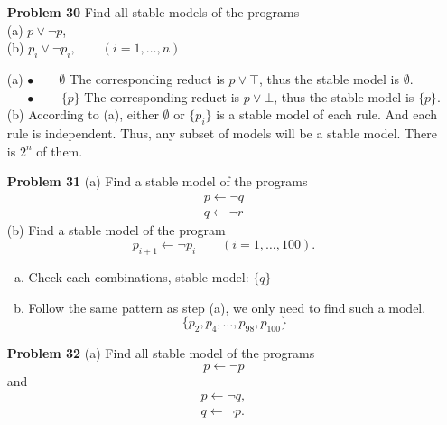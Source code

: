 \begin{enumerate}
\item[\textbf{Problem 30}] Find all stable models of the programs \\
(a) $p \vee \neg p$, \\
(b) $p_i \vee \neg p_i, \qquad (i = 1, \ldots, n)$

(a) $\bullet \qquad \emptyset$ The corresponding reduct is $p \vee \top$, thus the stable model is $\emptyset$. \\
    $~\quad\: \bullet \qquad \{p\}$ The corresponding reduct is $p \vee \bot$, thus the stable model is $\{p\}$. \\
    
(b) According to (a), either $\emptyset$ or $\{p_i\}$ is a stable model of each rule. And each rule is independent. Thus, any subset of models will be a stable model. There is $2^n$ of them.  

\item[\textbf{Problem 31}] (a) Find a stable model of the programs \\
\begin{equation}
\begin{gathered}
 p \leftarrow \neg q  \\
 q \leftarrow \neg r
\end{gathered}
\label{Prob_31}
\end{equation}
(b) Find a stable model of the program 
\begin{equation*}
 p_{i+1} \leftarrow \neg p_i \qquad (i = 1, \ldots, 100). 
\end{equation*}

\begin{enumerate}[(a)]
\item Check each combinations, stable model:  $\{q\}$
\item Follow the same pattern as step (a), we only need to find such a model. 
\begin{equation*}
 \{p_2, p_4, \ldots, p_{98}, p_{100}\}
\end{equation*}
\end{enumerate}

\item[\textbf{Problem 32}] (a) Find all stable model of the programs 
\begin{equation*}
 p \leftarrow \neg p
\end{equation*}
and 
\begin{gather*}
p \leftarrow \neg q, \\
q \leftarrow \neg p. 
\end{gather*}


\end{enumerate}
